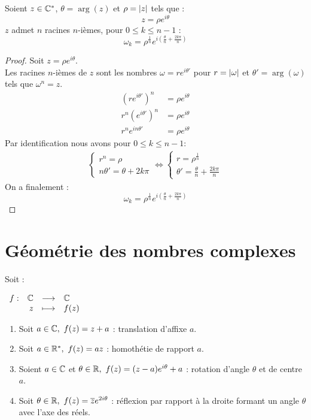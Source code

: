 \begin{proposition}
	Soient $z \in \mathbb{C}^*$, $\theta = \arg(z)$ et $\rho = \abs{z}$ tels que :
	\[ z = \rho e^{i\theta} \]
	$z$ admet $n$ racines $n$-ièmes, pour $0 \leq k \leq n - 1$ :
	\[ \omega_k = \rho^{\frac{1}{n}} e^{i \left( \frac{\theta}{n} + \frac{2 k \pi}{n} \right)} \]
\end{proposition}

\begin{proof}
	Soit $z = \rho e^{i \theta}$. \\
	Les racines $n$-ièmes de $z$ sont les nombres $\omega = re^{i \theta'}$ pour $r = \abs{\omega}$ et $\theta' = \arg(\omega)$ tels que $\omega^n = z$.
	\begin{align*}
		(r e^{i \theta'})^n &= \rho e^{i \theta} \\
		r^n (e^{i \theta'})^n &= \rho e^{i \theta} \\
		r^n e^{i n \theta'} &= \rho e^{i \theta}
	\end{align*} 
	Par identification nous avons pour $0 \leq k \leq n - 1$:
	\begin{align*}
		\begin{cases}
			r^n = \rho \\
			n \theta' = \theta + 2 k \pi
		\end{cases}
		\iff 
		\begin{cases}
			r = \rho^{\frac{1}{n}} \\
			\theta' = \frac{\theta}{n} + \frac{2 k \pi}{n}
		\end{cases}
	\end{align*}
	On a finalement : 
	\[ \omega_k = \rho^{\frac{1}{n}} e^{i \left( \frac{\theta}{n} + \frac{2 k \pi}{n} \right) } \]
\end{proof}

\section{Géométrie des nombres complexes}
\begin{proposition}
	Soit :
	\begin{center}
		$
		\begin{array}{rrcl} f : & \mathbb{C} & \longrightarrow & \mathbb{C} \\ & z & \longmapsto & f(z) \end{array}
		$
	\end{center}
	\begin{enumerate}
		\item Soit $a \in \mathbb{C},\ f(z) = z + a$ : translation d'affixe $a$.
		\item Soit $a \in \mathbb{R}^*,\ f(z) = az$ : homothétie de rapport $a$.
		\item Soient $a \in \mathbb{C}$ et $\theta \in \mathbb{R},\ f(z) = (z-a)e^{i\theta} + a$ : rotation d'angle $\theta$ et de centre $a$.
		\item Soit $\theta \in \mathbb{R},\ f(z) = \overline{z} e^{2i\theta}$ : réflexion par rapport à la droite formant un angle $\theta$ avec l'axe des réels.
	\end{enumerate}
\end{proposition}

